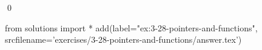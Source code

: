 
\begin{ex}
  \label{ex:3-28-pointers-and-functions}
  
  \qed
\end{ex}
\begin{python0}
from solutions import *
add(label="ex:3-28-pointers-and-functions",
    srcfilename='exercises/3-28-pointers-and-functions/answer.tex')
\end{python0}
